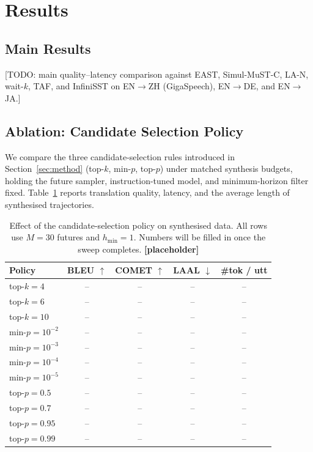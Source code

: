 \section{Results}
\label{sec:results}

\subsection{Main Results}

[TODO: main quality--latency comparison against EAST, Simul-MuST-C, LA-N,
wait-$k$, TAF, and InfiniSST on EN$\rightarrow$ZH (GigaSpeech),
EN$\rightarrow$DE, and EN$\rightarrow$JA.]

\subsection{Ablation: Candidate Selection Policy}

We compare the three candidate-selection rules introduced in
Section~\ref{sec:method} (top-$k$, min-$p$, top-$p$) under matched
synthesis budgets, holding the future sampler, instruction-tuned model,
and minimum-horizon filter fixed. Table~\ref{tab:ablation-policy} reports
translation quality, latency, and the average length of synthesised
trajectories.

\begin{table}[t]
\centering
\small
\begin{tabular}{lcccc}
\hline
\textbf{Policy} & \textbf{BLEU} $\uparrow$ & \textbf{COMET} $\uparrow$ & \textbf{LAAL} $\downarrow$ & \textbf{\#tok / utt} \\
\hline
top-$k{=}4$       & --   & --   & --   & -- \\
top-$k{=}6$       & --   & --   & --   & -- \\
top-$k{=}10$      & --   & --   & --   & -- \\
\hline
min-$p{=}10^{-2}$ & --   & --   & --   & -- \\
min-$p{=}10^{-3}$ & --   & --   & --   & -- \\
min-$p{=}10^{-4}$ & --   & --   & --   & -- \\
min-$p{=}10^{-5}$ & --   & --   & --   & -- \\
\hline
top-$p{=}0.5$     & --   & --   & --   & -- \\
top-$p{=}0.7$     & --   & --   & --   & -- \\
top-$p{=}0.95$    & --   & --   & --   & -- \\
top-$p{=}0.99$    & --   & --   & --   & -- \\
\hline
\end{tabular}
\caption{Effect of the candidate-selection policy on synthesised data.
All rows use $M{=}30$ futures and $h_{\min}{=}1$. Numbers will be filled
in once the sweep completes. \textbf{[placeholder]}}
\label{tab:ablation-policy}
\end{table}

